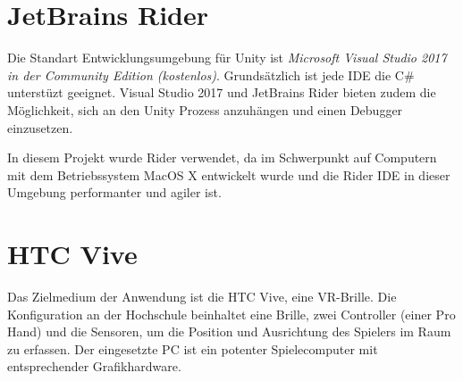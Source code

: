 \section{JetBrains Rider}
\label{Rider}
Die Standart Entwicklungsumgebung für Unity ist \emph{Microsoft Visual Studio 2017 in der Community Edition (kostenlos)}. Grundsätzlich ist jede IDE die C\# unterstüzt geeignet. Visual Studio 2017 und JetBrains Rider bieten zudem die Möglichkeit, sich an den Unity Prozess anzuhängen und einen Debugger einzusetzen. 

In diesem Projekt wurde Rider verwendet, da im Schwerpunkt auf Computern mit dem Betriebssystem MacOS X entwickelt wurde und die Rider IDE in dieser Umgebung performanter und agiler ist.


\section{HTC Vive}
\label{Vive}
Das Zielmedium der Anwendung ist die HTC Vive, eine VR-Brille. Die Konfiguration an der Hochschule beinhaltet eine Brille, zwei Controller (einer Pro Hand) und die Sensoren, um die Position und Ausrichtung des Spielers im Raum zu erfassen. 
Der eingesetzte PC ist ein potenter Spielecomputer mit entsprechender Grafikhardware.

 